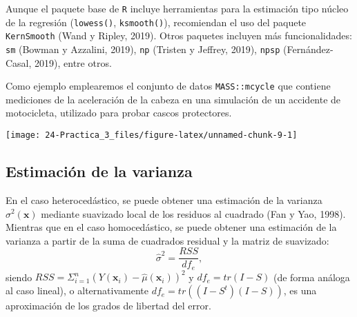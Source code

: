 \documentclass[
]{book}
\newenvironment{Shaded}{\begin{snugshade}}{\end{snugshade}}
\newcommand{\CommentTok}[1]{\textcolor[rgb]{0.56,0.35,0.01}{\textit{#1}}}
\newcommand{\DataTypeTok}[1]{\textcolor[rgb]{0.13,0.29,0.53}{#1}}
\newcommand{\KeywordTok}[1]{\textcolor[rgb]{0.13,0.29,0.53}{\textbf{#1}}}
\newcommand{\NormalTok}[1]{#1}
\newcommand{\OperatorTok}[1]{\textcolor[rgb]{0.81,0.36,0.00}{\textbf{#1}}}
\newcommand{\StringTok}[1]{\textcolor[rgb]{0.31,0.60,0.02}{#1}}
\theoremstyle{definition}
\theoremstyle{definition}
\theoremstyle{definition}
\theoremstyle{remark}
\begin{document}
Aunque el paquete base de \texttt{R} incluye herramientas para la estimación
tipo núcleo de la regresión (\texttt{lowess()}, \texttt{ksmooth()}), recomiendan
el uso del paquete \texttt{KernSmooth} (Wand y Ripley, 2019).
Otros paquetes incluyen más funcionalidades: \texttt{sm} (Bowman y Azzalini, 2019),
\texttt{np} (Tristen y Jeffrey, 2019), \texttt{npsp} (Fernández-Casal, 2019), entre otros.

Como ejemplo emplearemos el conjunto de datos \texttt{MASS::mcycle} que contiene mediciones
de la aceleración de la cabeza en una simulación de un accidente de motocicleta,
utilizado para probar cascos protectores.

\begin{Shaded}
\end{Shaded}

\begin{center}\texttt{[image: 24-Practica\_3\_files/figure-latex/unnamed-chunk-9-1]} \end{center}

\hypertarget{estimaciuxf3n-de-la-varianza}{%
\subsection{Estimación de la varianza}\label{estimaciuxf3n-de-la-varianza}}

En el caso heterocedástico, se puede obtener una estimación de la varianza
\(\sigma^2(\mathbf{x})\) mediante suavizado local de los residuos al cuadrado
(Fan y Yao, 1998). Mientras que en el caso homocedástico, se puede obtener
una estimación de la varianza a partir de la suma de cuadrados residual y la
matriz de suavizado:
\[\hat\sigma^2 = \frac{RSS}{df_e},\]
siendo \(RSS=\Sigma_{i=1}^n \left( Y(\mathbf{x}_i) - \hat\mu(\mathbf{x}_i) \right)^2\)
y \(df_e = tr(I - S)\) (de forma análoga al caso lineal), o alternativamente \(df_e = tr \left( (I - S^t)(I - S)\right)\), es una aproximación de los grados de libertad del error.
\end{document}
